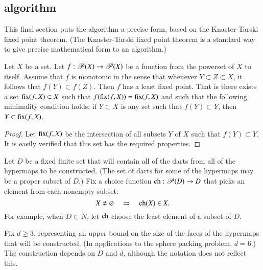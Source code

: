 \subsection{algorithm}

This final section puts the algorithm a precise form, based on
the Knaster-Tarski fixed point theorem.  (The Knaster-Tarski fixed
point theorem is a standard way to give precise mathematical form to
an algorithm.)

\begin{lemma}   
Let $X$ be a set.  Let $f:{\mathscr P}(X)\to {\mathscr P}(X)$ be a
function from the powerset of $X$ to itself.  Assume that $f$ is
monotonic in the sense that whenever $Y\subset Z\subset X$, it
follows that $f(Y) \subset f(Z)$.  Then $f$ has a least fixed point.
That is there exists a set ${\operatorname{fix}}(f,X)\subset X$ such that
$f({\operatorname{fix}}(f,X)) = {\operatorname{fix}}(f,X)$ and such that the following
minimality condition holds: if $Y\subset X$ is any set such that
$f(Y) \subset Y$, then $Y\subset {\operatorname{fix}}(f,X)$.
\end{lemma}
%
%
%
%
%

\begin{proof} Let ${\operatorname{fix}}(f,X)$ be the intersection of all subsets
$Y$ of $X$ such that $f(Y)\subset Y$.  It is easily verified that
this set has the required properties.
\end{proof}


Let $D$ be a fixed finite set that will contain all of the darts from
all of the hypermaps to be constructed.  (The set of darts for some of
the hypermaps may be a proper subset of $D$.)  Fix a choice function
${\operatorname{ch}}:{\mathscr P}(D)\to D$ that picks an element from each nonempty
subset:
\begin{displaymath}
X\ne\varnothing\quad  \Rightarrow \quad  {\operatorname{ch}}(X)\in X.
\end{displaymath}
 For example, when
$D\subset\ring{N}$, let ${\operatorname{ch}}$ choose the least element of a subset
of $D$.

Fix $d\ge 3$, representing an upper bound on the size of the faces of
the hypermaps that will be constructed.  (In applications to the
sphere packing problem, $d=6$.)  The construction depends on $D$ and
$d$, although the notation does not reflect this.
%

